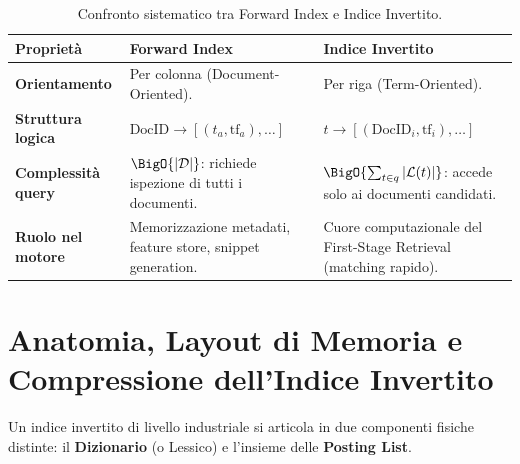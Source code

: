 \begin{table}[H]
\centering
\small
\begin{tabularx}{\linewidth}{l X X}
\toprule
\textbf{Propriet\`a} & \textbf{Forward Index} & \textbf{Indice Invertito} \\
\midrule
\textbf{Orientamento} & Per colonna (Document-Oriented). & Per riga (Term-Oriented). \\
\addlinespace
\textbf{Struttura logica} & $\text{DocID} \to [(t_a, \text{tf}_a), \dots]$ & $t \to [(\text{DocID}_i, \text{tf}_i), \dots]$ \\
\addlinespace
\textbf{Complessit\`a query} & $\BigO{|\mathcal{D}|}$: richiede ispezione di tutti i documenti. & $\BigO{\sum_{t \in q} |\mathcal{L}(t)|}$: accede solo ai documenti candidati. \\
\addlinespace
\textbf{Ruolo nel motore} & Memorizzazione metadati, feature store, snippet generation. & Cuore computazionale del First-Stage Retrieval (matching rapido). \\
\bottomrule
\end{tabularx}
\caption{Confronto sistematico tra Forward Index e Indice Invertito.}
\label{tab:fwd-vs-inv}
\end{table}

\FloatBarrier
\section{Anatomia, Layout di Memoria e Compressione dell'Indice Invertito}
\label{sec:anatomia-compressione-indice}

Un indice invertito di livello industriale si articola in due componenti fisiche distinte: il \textbf{Dizionario} (o Lessico) e l'insieme delle \textbf{Posting List}.

